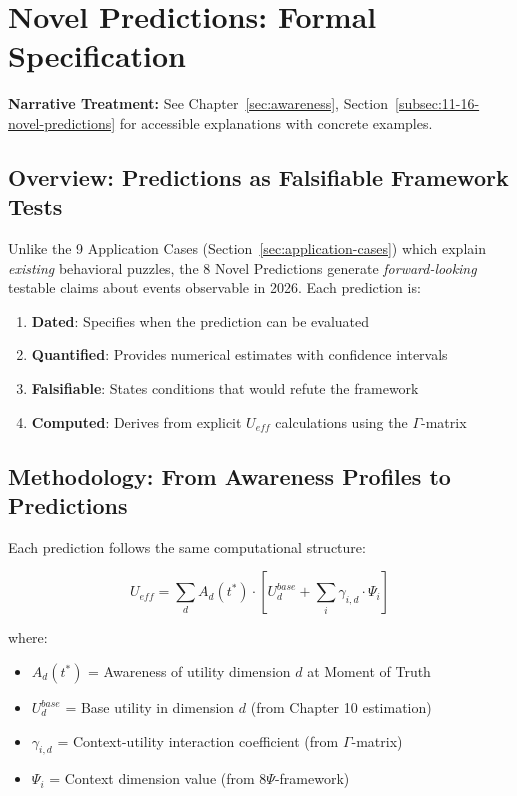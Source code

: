 \section{Novel Predictions: Formal Specification}
\label{sec:au-novel-predictions}

\begin{cross-reference}
\textbf{Narrative Treatment:} See Chapter~\ref{sec:awareness}, Section~\ref{subsec:11-16-novel-predictions}
for accessible explanations with concrete examples.
\end{cross-reference}

\subsection{Overview: Predictions as Falsifiable Framework Tests}

Unlike the 9 Application Cases (Section~\ref{sec:application-cases}) which explain \emph{existing} 
behavioral puzzles, the 8 Novel Predictions generate \emph{forward-looking} testable claims 
about events observable in 2026. Each prediction is:

\begin{enumerate}
    \item \textbf{Dated}: Specifies when the prediction can be evaluated
    \item \textbf{Quantified}: Provides numerical estimates with confidence intervals
    \item \textbf{Falsifiable}: States conditions that would refute the framework
    \item \textbf{Computed}: Derives from explicit $U_{eff}$ calculations using the $\Gamma$-matrix
\end{enumerate}

\subsection{Methodology: From Awareness Profiles to Predictions}

Each prediction follows the same computational structure:

\begin{equation}
U_{eff} = \sum_d A_d(t^*) \cdot \left[ U_d^{base} + \sum_i \gamma_{i,d} \cdot \Psi_i \right]
\end{equation}

where:
\begin{itemize}
    \item $A_d(t^*)$ = Awareness of utility dimension $d$ at Moment of Truth
    \item $U_d^{base}$ = Base utility in dimension $d$ (from Chapter 10 estimation)
    \item $\gamma_{i,d}$ = Context-utility interaction coefficient (from $\Gamma$-matrix)
    \item $\Psi_i$ = Context dimension value (from 8$\Psi$-framework)
\end{itemize}

